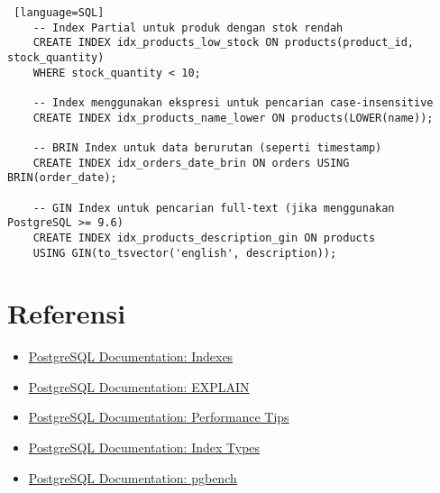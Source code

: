 \begin{lstlisting} [language=SQL]
	-- Index Partial untuk produk dengan stok rendah
	CREATE INDEX idx_products_low_stock ON products(product_id, stock_quantity) 
	WHERE stock_quantity < 10;
	
	-- Index menggunakan ekspresi untuk pencarian case-insensitive
	CREATE INDEX idx_products_name_lower ON products(LOWER(name));
	
	-- BRIN Index untuk data berurutan (seperti timestamp)
	CREATE INDEX idx_orders_date_brin ON orders USING BRIN(order_date);
	
	-- GIN Index untuk pencarian full-text (jika menggunakan PostgreSQL >= 9.6)
	CREATE INDEX idx_products_description_gin ON products 
	USING GIN(to_tsvector('english', description));
\end{lstlisting}

\section{Referensi}

\begin{itemize}
    \item \href{https://www.postgresql.org/docs/current/indexes.html}{PostgreSQL Documentation: Indexes}
    \item \href{https://www.postgresql.org/docs/current/using-explain.html}{PostgreSQL Documentation: EXPLAIN}
    \item \href{https://www.postgresql.org/docs/current/performance-tips.html}{PostgreSQL Documentation: Performance Tips}
    \item \href{https://www.postgresql.org/docs/current/indexes-types.html}{PostgreSQL Documentation: Index Types}
    \item \href{https://www.postgresql.org/docs/current/pgbench.html}{PostgreSQL Documentation: pgbench}
\end{itemize}